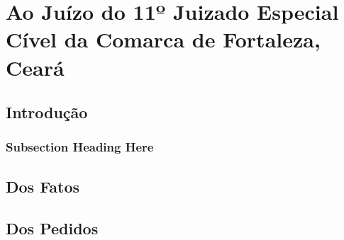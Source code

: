 \documentclass[
  12pt,
	oneside,
	a4paper,
	english,			%
	french,				%
	spanish,			%
  brazil
]{memoir}
\begin{document}
\chapter{Ao Juízo do 11º Juizado Especial Cível da Comarca de Fortaleza, Ceará}

\lipsum[1]

\section{Introdução}

\lipsum[1-2]

\subsection{Subsection Heading Here}
\lipsum[1-2]

\section{Dos Fatos}
\lipsum[2-8]

\section{Dos Pedidos}
\lipsum[1-3]
\end{document}

